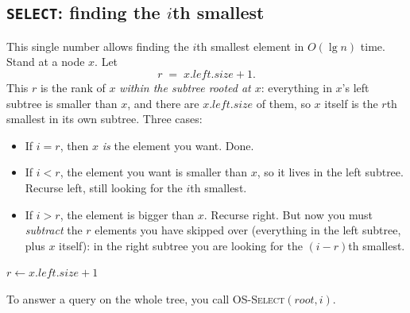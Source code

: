 \subsection{\texttt{SELECT}: finding the $i$th smallest}

This single number allows finding the $i$th smallest element in $O(\lg n)$ time.
Stand at a node $x$. Let
\[
  r \;=\; x.\mathit{left}.\mathit{size} + 1.
\]
This $r$ is the rank of $x$ \emph{within the subtree rooted at $x$}: everything in
$x$'s left subtree is smaller than $x$, and there are
$x.\mathit{left}.\mathit{size}$ of them, so $x$ itself is the
$r$th smallest in its own subtree. Three cases:

\begin{itemize}
  \item If $i = r$, then $x$ \emph{is} the element you want. Done.
  \item If $i < r$, the element you want is smaller than $x$, so it lives in the
    left subtree. Recurse left, still looking for the $i$th smallest.
  \item If $i > r$, the element is bigger than $x$. Recurse right. But now you
    must \emph{subtract} the $r$ elements you have skipped over (everything in
    the left subtree, plus $x$ itself): in the right subtree you are looking
    for the $(i - r)$th smallest.
\end{itemize}

\begin{algorithm}[H]
\caption{\textsc{OS-Select}$(x, i)$ --- the $i$th smallest in the subtree at $x$}
$r \gets x.\mathit{left}.\mathit{size} + 1$\;
\end{algorithm}

To answer a query on the whole tree, you call
\textsc{OS-Select}$(\mathit{root}, i)$.

